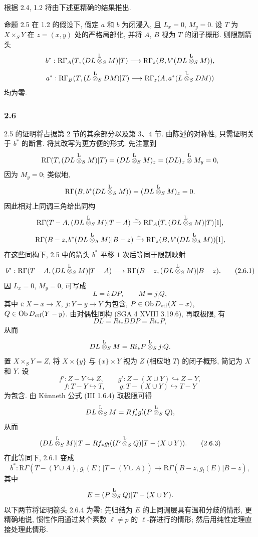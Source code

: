 根据 2.4, 1.2 将由下述更精确的结果推出.

\begin{statement}{命题 2.5}
在 1.2 的假设下, 假定 $a$ 和 $b$ 为闭浸入, 且 $L_x=0$, $M_y=0$. 设 $T$ 为 $X\times_SY$ 在 $z=(x,y)$ 处的严格局部化, 并将 $A$, $B$ 视为 $T$ 的闭子概形. 则限制箭头
\[
b^*:\mathrm R\Gamma_A(T,(DL\overset{\mathrm L}{\otimes}_SM)|T)
 \longrightarrow \mathrm R\Gamma_z(B,b^*(DL\overset{\mathrm L}{\otimes}_SM)),
\]
\[
a^*:\mathrm R\Gamma_B(T,(L\overset{\mathrm L}{\otimes}_SDM)|T)
 \longrightarrow \mathrm R\Gamma_z(A,a^*(L\overset{\mathrm L}{\otimes}_SDM))
\]
均为零.
\end{statement}

\subsubsection*{2.6}
2.5 的证明将占据第 2 节的其余部分以及第 3、4 节. 由陈述的对称性, 只需证明关于 $b^*$ 的断言. 将其改写为更方便的形式. 先注意到
\[
\mathrm R\Gamma(T,(DL\overset{\mathrm L}{\otimes}_SM)|T)
 =(DL\overset{\mathrm L}{\otimes}_SM)_z
 =(DL)_x\overset{\mathrm L}{\otimes} M_y=0,
\]
因为 $M_y=0$; 类似地,
\[
\mathrm R\Gamma(B,b^*(DL\overset{\mathrm L}{\otimes}_SM))
 =(DL\overset{\mathrm L}{\otimes}_SM)_z=0.
\]
因此相对上同调三角给出同构
\[
\mathrm R\Gamma(T-A,(DL\overset{\mathrm L}{\otimes}_SM)|T-A)
 \xrightarrow{\sim}
\mathrm R\Gamma_A(T,(DL\overset{\mathrm L}{\otimes}_SM)|T)[1],
\]
\[
\mathrm R\Gamma(B-z,b^*(DL\overset{\mathrm L}{\otimes}_{\Lambda}M)|B-z)
 \xrightarrow{\sim}
\mathrm R\Gamma_z(B,b^*(DL\overset{\mathrm L}{\otimes}_{\Lambda}M))[1],
\]
在这些同构下, 2.5 中的箭头 $b^*$ 平移 $1$ 次后等同于限制映射
\begin{equation}
b^*:\mathrm R\Gamma(T-A,(DL\overset{\mathrm L}{\otimes}_SM)|T-A)
 \longrightarrow \mathrm R\Gamma(B-z,(DL\overset{\mathrm L}{\otimes}_SM)|B-z).
\tag{2.6.1}
\end{equation}
因 $L_x=0$, $M_y=0$, 可写成
\begin{equation}
L=i_!DP,\qquad M=j_!Q,
\tag{2.6.2}
\end{equation}
其中 $i:X-x\to X$, $j:Y-y\to Y$ 为包含, $P\in\operatorname{Ob} D_{\mathrm{ctf}}(X-x)$, $Q\in\operatorname{Ob} D_{\mathrm{ctf}}(Y-y)$. 由对偶性同构 (SGA 4 XVIII 3.19.6), 再取极限, 有
\[
DL=Ri_*DDP=Ri_*P,
\]
从而
\[
DL\overset{\mathrm L}{\otimes}_SM=Ri_*P\overset{\mathrm L}{\otimes}_Sj_!Q.
\]
置 $X\times_SY=Z$, 将 $X\times\{y\}$ 与 $\{x\}\times Y$ 视为 $Z$ (相应地 $T$) 的闭子概形, 简记为 $X$ 和 $Y$. 设
\[
f':Z-Y\hookrightarrow Z,\qquad
g':Z-(X\cup Y)\hookrightarrow Z-Y,
\]
\[
f:T-Y\hookrightarrow T,\qquad
g:T-(X\cup Y)\hookrightarrow T-Y
\]
为包含. 由 Künneth 公式 (III 1.6.4) 取极限可得
\[
DL\overset{\mathrm L}{\otimes}_SM=Rf'_*g'_!(P\overset{\mathrm L}{\otimes}_SQ),
\]
从而
\begin{equation}
(DL\overset{\mathrm L}{\otimes}_SM)|T=Rf_*g_!((P\overset{\mathrm L}{\otimes}_SQ)|T-(X\cup Y)).
\tag{2.6.3}
\end{equation}
在此等同下, 2.6.1 变成
\begin{equation}
b^*:\mathrm R\Gamma(T-(Y\cup A),g_!(E)|T-(Y\cup A))
 \longrightarrow \mathrm R\Gamma(B-z,g_!(E)|B-z),
\tag{2.6.4}
\end{equation}
其中
\[
E=(P\overset{\mathrm L}{\otimes}_SQ)|T-(X\cup Y).
\]
以下两节将证明箭头 2.6.4 为零: 先归结为 $E$ 的上同调层具有温和分歧的情形, 更精确地说, 惯性作用通过某个素数 $\ell\ne p$ 的 $\ell$-群进行的情形; 然后用纯性定理直接处理此情形.

